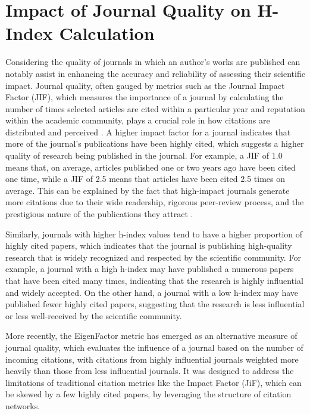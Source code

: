 \section{Impact of Journal Quality on H-Index Calculation}
Considering the quality of journals in which an author's works are published
can notably assist in enhancing the accuracy and reliability of assessing their
scientific impact. Journal quality, often gauged by metrics such as the Journal
Impact Factor (JIF), which measures the importance of a journal by calculating
the number of times selected articles are cited within a particular year and
reputation within the academic community, plays a crucial role in how citations
are distributed and perceived \cite{garfield1999journal, garfield2006history}.
A higher impact factor for a journal indicates that more of the journal's
publications have been highly cited, which suggests a higher quality of
research being published in the journal. For example, a JIF of 1.0 means that,
on average, articles published one or two years ago have been cited one time,
while a JIF of 2.5 means that articles have been cited 2.5 times on average.
This can be explained by the fact that high-impact journals generate more
citations due to their wide readership, rigorous peer-review process, and the
prestigious nature of the publications they attract \cite{garfield2006history}.

Similarly, journals with higher h-index values tend to have a higher proportion
of highly cited papers, which indicates that the journal is publishing
high-quality research that is widely recognized and respected by the scientific
community. For example, a journal with a high h-index may have published a
numerous papers that have been cited many times, indicating that the research
is highly influential and widely accepted. On the other hand, a journal with a
low h-index may have published fewer highly cited papers, suggesting that the
research is less influential or less well-received by the scientific community.

More recently, the EigenFactor metric has emerged as an alternative measure of
journal quality, which evaluates the influence of a journal based on the number
of incoming citations, with citations from highly influential journals weighted
more heavily than those from less influential journals. It was designed to
address the limitations of traditional citation metrics like the Impact Factor
(JiF), which can be skewed by a few highly cited papers, by leveraging the
structure of citation networks.


